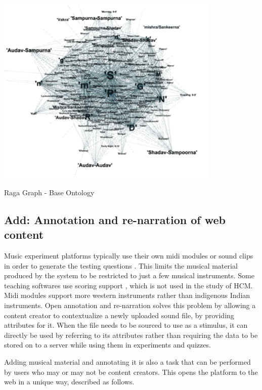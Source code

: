 \documentclass{tufte-handout}
\begin{document}
  
\begin{marginfigure}
\centering
    \includegraphics[width=0.8\textwidth]{graph.png}
\caption{Raga Graph - Base Ontology}
\label{fig:onto}
\end{marginfigure}

\subsection{Add: Annotation and re-narration of web content}

Music experiment platforms typically use their own midi modules or sound clips in order to generate the testing questions \cite{tambouratzis2008vemus}. This limits the musical material produced by the system to be restricted to just a few musical instruments. Some teaching softwares use scoring support \cite{kuuskankare2010pwgl}, which is not used in the study of HCM. Midi modules support more western instruments rather than indigenous Indian instruments. Open annotation and re-narration solves this problem by allowing a content creator to contextualize a newly uploaded sound file, by providing attributes for it. When the file needs to be sourced to use as a stimulus, it can directly be used by referring to its attributes rather than requiring the data to be stored on to a server while using them in experiments and quizzes. 

Adding musical material and annotating it is also a task that can be performed by  users who may or may not be content creators. This opens the platform to the web in a unique way, described as follows.
\end{document}
